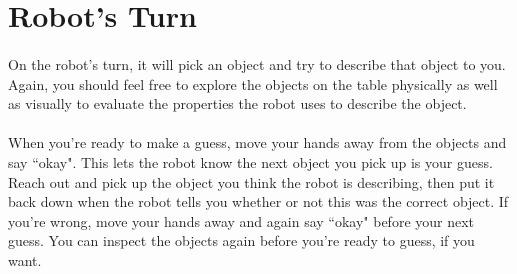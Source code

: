\documentclass{article}
\begin{document}
\section {Robot's Turn}

\paragraph{} On the robot's turn, it will pick an object and try to describe that object to you. Again, you should feel free to explore the objects on the table physically as well as visually to evaluate the properties the robot uses to describe the object.

\paragraph{} When you're ready to make a guess, move your hands away from the objects and say ``okay". This lets the robot know the next object you pick up is your guess. Reach out and pick up the object you think the robot is describing, then put it back down when the robot tells you whether or not this was the correct object. If you're wrong, move your hands away and again say ``okay" before your next guess. You can inspect the objects again before you're ready to guess, if you want.
\end{document}
